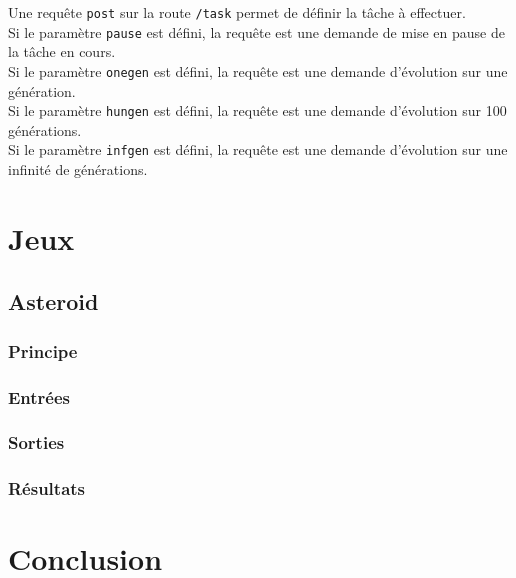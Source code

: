 \documentclass{article}
\begin{document}
Une requête \texttt{post} sur la route \texttt{/task} permet de définir la tâche à effectuer.\\

Si le paramètre \texttt{pause} est défini, la requête est une demande de mise en pause de la tâche en cours.\\

Si le paramètre \texttt{onegen} est défini, la requête est une demande d'évolution sur une génération.\\

Si le paramètre \texttt{hungen} est défini, la requête est une demande d'évolution sur 100 générations.\\

Si le paramètre \texttt{infgen} est défini, la requête est une demande d'évolution sur une infinité de générations.\\

\newpage
\section{Jeux}
\subsection{Asteroid}
\subsubsection{Principe}
\subsubsection{Entrées}
\subsubsection{Sorties}
\subsubsection{Résultats}

\newpage
\section{Conclusion}

\newpage


\end{document}

